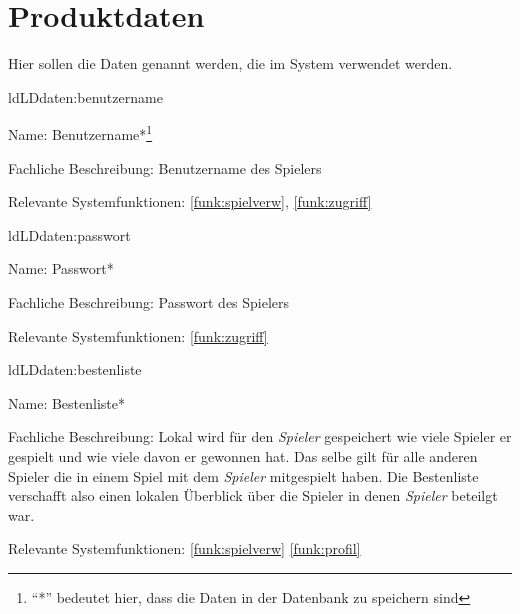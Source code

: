 
\section{Produktdaten}\label{section:productdaten}

Hier sollen die Daten genannt werden, die im System verwendet werden.

\setcounter{ld}{10}

\begin{description}[leftmargin=5em, style=sameline]
	
	\begin{lhp}{ld}{LD}{daten:benutzername}
		\item [Name:] Benutzername*\footnote{``*'' bedeutet hier, dass die Daten in der Datenbank zu speichern sind}
		\item [Fachliche Beschreibung:] Benutzername des Spielers
		\item [Relevante Systemfunktionen:] \ref{funk:spielverw}, \ref{funk:zugriff}
	\end{lhp}
	
	\begin{lhp}{ld}{LD}{daten:passwort}
		\item [Name:] Passwort*
		\item [Fachliche Beschreibung:] Passwort des Spielers
		\item [Relevante Systemfunktionen:] \ref{funk:zugriff}
	\end{lhp}

	\begin{lhp}{ld}{LD}{daten:bestenliste}
		\item [Name:] Bestenliste*
		\item [Fachliche Beschreibung:] Lokal wird für den \textit{Spieler} gespeichert wie viele Spieler er gespielt und wie viele davon er gewonnen hat.
										Das selbe gilt für alle anderen Spieler die in einem Spiel mit dem \textit{Spieler} mitgespielt haben.
										Die Bestenliste verschafft also einen lokalen Überblick über die Spieler in denen \textit{Spieler} beteilgt war.
		\item [Relevante Systemfunktionen:] \ref{funk:spielverw} \ref{funk:profil}
	\end{lhp}
\end{description}